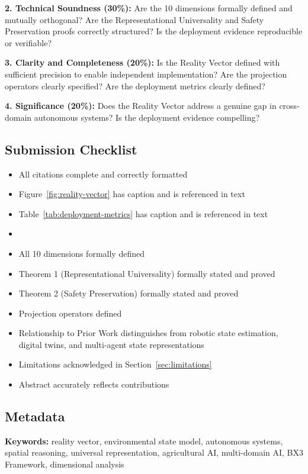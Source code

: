 \documentclass[12pt]{article}
\begin{document}
\textbf{2. Technical Soundness (30\%):} Are the 10 dimensions formally defined and mutually orthogonal? Are the Representational Universality and Safety Preservation proofs correctly structured? Is the deployment evidence reproducible or verifiable?

\textbf{3. Clarity and Completeness (20\%):} Is the Reality Vector defined with sufficient precision to enable independent implementation? Are the projection operators clearly specified? Are the deployment metrics clearly defined?

\textbf{4. Significance (20\%):} Does the Reality Vector address a genuine gap in cross-domain autonomous systems? Is the deployment evidence compelling?

\subsection*{Submission Checklist}

\begin{itemize}[noitemsep]
    \item[ ] All citations complete and correctly formatted
    \item[ ] Figure~\ref{fig:reality-vector} has caption and is referenced in text
    \item[ ] Table~\ref{tab:deployment-metrics} has caption and is referenced in text
    \item[itemsep=0pt]
    \item[ ] All 10 dimensions formally defined
    \item[ ] Theorem 1 (Representational Universality) formally stated and proved
    \item[ ] Theorem 2 (Safety Preservation) formally stated and proved
    \item[ ] Projection operators defined
    \item[ ] Relationship to Prior Work distinguishes from robotic state estimation, digital twins, and multi-agent state representations
    \item[ ] Limitations acknowledged in Section~\ref{sec:limitations}
    \item[ ] Abstract accurately reflects contributions
\end{itemize}

\subsection*{Metadata}

\textbf{Keywords:} reality vector, environmental state model, autonomous systems, spatial reasoning, universal representation, agricultural AI, multi-domain AI, BX3 Framework, dimensional analysis
\end{document}
